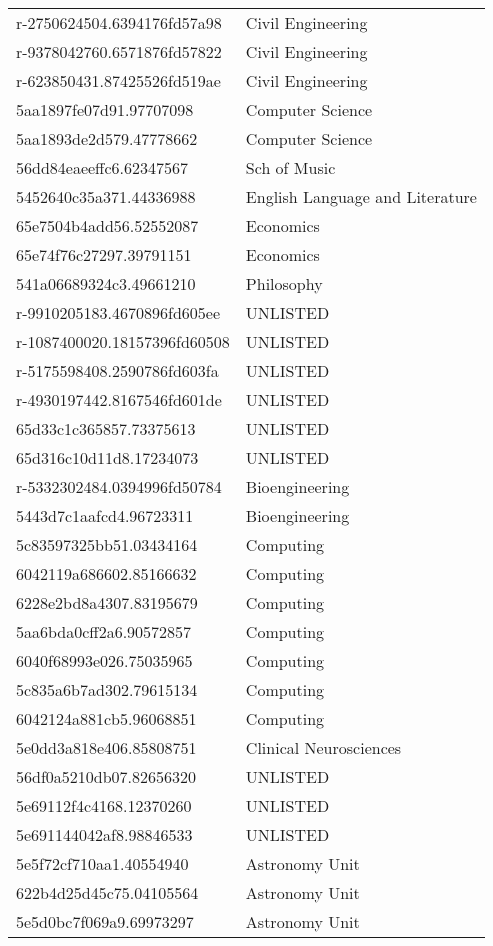 \begin{tabular}{ll}
r-2750624504.6394176fd57a98 & Civil Engineering \\
r-9378042760.6571876fd57822 & Civil Engineering \\
r-623850431.87425526fd519ae & Civil Engineering \\
5aa1897fe07d91.97707098 & Computer Science \\
5aa1893de2d579.47778662 & Computer Science \\
56dd84eaeeffc6.62347567 & Sch of Music \\
5452640c35a371.44336988 & English Language and Literature \\
65e7504b4add56.52552087 & Economics \\
65e74f76c27297.39791151 & Economics \\
541a06689324c3.49661210 & Philosophy \\
r-9910205183.4670896fd605ee & UNLISTED \\
r-1087400020.18157396fd60508 & UNLISTED \\
r-5175598408.2590786fd603fa & UNLISTED \\
r-4930197442.8167546fd601de & UNLISTED \\
65d33c1c365857.73375613 & UNLISTED \\
65d316c10d11d8.17234073 & UNLISTED \\
r-5332302484.0394996fd50784 & Bioengineering \\
5443d7c1aafcd4.96723311 & Bioengineering \\
5c83597325bb51.03434164 & Computing \\
6042119a686602.85166632 & Computing \\
6228e2bd8a4307.83195679 & Computing \\
5aa6bda0cff2a6.90572857 & Computing \\
6040f68993e026.75035965 & Computing \\
5c835a6b7ad302.79615134 & Computing \\
6042124a881cb5.96068851 & Computing \\
5e0dd3a818e406.85808751 & Clinical Neurosciences \\
56df0a5210db07.82656320 & UNLISTED \\
5e69112f4c4168.12370260 & UNLISTED \\
5e691144042af8.98846533 & UNLISTED \\
5e5f72cf710aa1.40554940 & Astronomy Unit \\
622b4d25d45c75.04105564 & Astronomy Unit \\
5e5d0bc7f069a9.69973297 & Astronomy Unit \\

\end{tabular}
